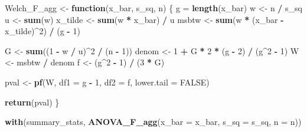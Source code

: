 \documentclass[
]{book}
\newenvironment{Shaded}{\begin{snugshade}}{\end{snugshade}}
\newcommand{\AttributeTok}[1]{\textcolor[rgb]{0.13,0.29,0.53}{#1}}
\newcommand{\ConstantTok}[1]{\textcolor[rgb]{0.56,0.35,0.01}{#1}}
\newcommand{\ControlFlowTok}[1]{\textcolor[rgb]{0.13,0.29,0.53}{\textbf{#1}}}
\newcommand{\DecValTok}[1]{\textcolor[rgb]{0.00,0.00,0.81}{#1}}
\newcommand{\FunctionTok}[1]{\textcolor[rgb]{0.13,0.29,0.53}{\textbf{#1}}}
\newcommand{\NormalTok}[1]{#1}
\newcommand{\OtherTok}[1]{\textcolor[rgb]{0.56,0.35,0.01}{#1}}
\newcommand{\SpecialCharTok}[1]{\textcolor[rgb]{0.81,0.36,0.00}{\textbf{#1}}}
\begin{document}
\begin{Shaded}
\begin{Highlighting}[]
\NormalTok{Welch\_F\_agg }\OtherTok{\textless{}{-}} \ControlFlowTok{function}\NormalTok{(x\_bar, s\_sq, n) \{}
\NormalTok{  g }\OtherTok{=} \FunctionTok{length}\NormalTok{(x\_bar)}
\NormalTok{  w }\OtherTok{\textless{}{-}}\NormalTok{ n }\SpecialCharTok{/}\NormalTok{ s\_sq}
\NormalTok{  u }\OtherTok{\textless{}{-}} \FunctionTok{sum}\NormalTok{(w)}
\NormalTok{  x\_tilde }\OtherTok{\textless{}{-}} \FunctionTok{sum}\NormalTok{(w }\SpecialCharTok{*}\NormalTok{ x\_bar) }\SpecialCharTok{/}\NormalTok{ u}
\NormalTok{  msbtw }\OtherTok{\textless{}{-}} \FunctionTok{sum}\NormalTok{(w }\SpecialCharTok{*}\NormalTok{ (x\_bar }\SpecialCharTok{{-}}\NormalTok{ x\_tilde)}\SpecialCharTok{\^{}}\DecValTok{2}\NormalTok{) }\SpecialCharTok{/}\NormalTok{ (g }\SpecialCharTok{{-}} \DecValTok{1}\NormalTok{)}

\NormalTok{  G }\OtherTok{\textless{}{-}} \FunctionTok{sum}\NormalTok{((}\DecValTok{1} \SpecialCharTok{{-}}\NormalTok{ w }\SpecialCharTok{/}\NormalTok{ u)}\SpecialCharTok{\^{}}\DecValTok{2} \SpecialCharTok{/}\NormalTok{ (n }\SpecialCharTok{{-}} \DecValTok{1}\NormalTok{))}
\NormalTok{  denom }\OtherTok{\textless{}{-}} \DecValTok{1} \SpecialCharTok{+}\NormalTok{  G }\SpecialCharTok{*} \DecValTok{2} \SpecialCharTok{*}\NormalTok{ (g }\SpecialCharTok{{-}} \DecValTok{2}\NormalTok{) }\SpecialCharTok{/}\NormalTok{ (g}\SpecialCharTok{\^{}}\DecValTok{2} \SpecialCharTok{{-}} \DecValTok{1}\NormalTok{)}
\NormalTok{  W }\OtherTok{\textless{}{-}}\NormalTok{ msbtw }\SpecialCharTok{/}\NormalTok{ denom}
\NormalTok{  f }\OtherTok{\textless{}{-}}\NormalTok{ (g}\SpecialCharTok{\^{}}\DecValTok{2} \SpecialCharTok{{-}} \DecValTok{1}\NormalTok{) }\SpecialCharTok{/}\NormalTok{ (}\DecValTok{3} \SpecialCharTok{*}\NormalTok{ G)}

\NormalTok{  pval }\OtherTok{\textless{}{-}} \FunctionTok{pf}\NormalTok{(W, }\AttributeTok{df1 =}\NormalTok{ g }\SpecialCharTok{{-}} \DecValTok{1}\NormalTok{, }\AttributeTok{df2 =}\NormalTok{ f, }\AttributeTok{lower.tail =} \ConstantTok{FALSE}\NormalTok{)}

  \FunctionTok{return}\NormalTok{(pval)}
\NormalTok{\}}

\FunctionTok{with}\NormalTok{(summary\_stats, }\FunctionTok{ANOVA\_F\_agg}\NormalTok{(}\AttributeTok{x\_bar =}\NormalTok{ x\_bar, }\AttributeTok{s\_sq =}\NormalTok{ s\_sq, }\AttributeTok{n =}\NormalTok{ n))}
\end{Highlighting}
\end{Shaded}
\end{document}
